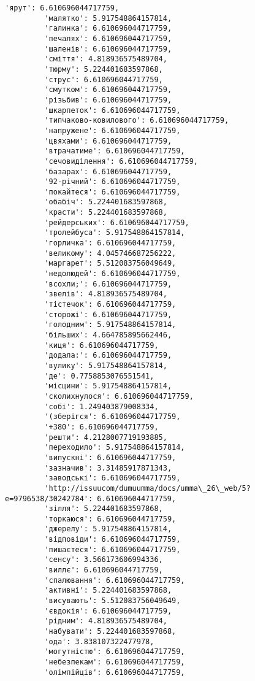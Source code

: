 \documentclass[11pt]{article}
\begin{document}
\begin{Verbatim}[commandchars=\\\{\}]
         'ярут': 6.610696044717759,
         'малятко': 5.917548864157814,
         'галинка': 6.610696044717759,
         'печалях': 6.610696044717759,
         'шаленів': 6.610696044717759,
         'сміття': 4.818936575489704,
         'тюрму': 5.224401683597868,
         'струс': 6.610696044717759,
         'смутком': 6.610696044717759,
         'різьбив': 6.610696044717759,
         'шкарпеток': 6.610696044717759,
         'типчаково-ковилового': 6.610696044717759,
         'напружене': 6.610696044717759,
         'цвяхами': 6.610696044717759,
         'втрачатиме': 6.610696044717759,
         'сечовиділення': 6.610696044717759,
         'базарах': 6.610696044717759,
         '92-річний': 6.610696044717759,
         'покайтеся': 6.610696044717759,
         'обабіч': 5.224401683597868,
         'красти': 5.224401683597868,
         'рейдерських': 6.610696044717759,
         'тролейбуса': 5.917548864157814,
         'горличка': 6.610696044717759,
         'великому': 4.045746687256222,
         'маргарет': 5.512083756049649,
         'недолюдей': 6.610696044717759,
         'всохли;': 6.610696044717759,
         'звелів': 4.818936575489704,
         'тістечок': 6.610696044717759,
         'сторожі': 6.610696044717759,
         'голодним': 5.917548864157814,
         'більших': 4.664785895662446,
         'киця': 6.610696044717759,
         'додала:': 6.610696044717759,
         'вулику': 5.917548864157814,
         'де': 0.7758853076551541,
         'місцини': 5.917548864157814,
         'сколихнулося': 6.610696044717759,
         'собі': 1.249403879008334,
         '(зберігся': 6.610696044717759,
         '+380': 6.610696044717759,
         'решти': 4.2128007719193885,
         'переходило': 5.917548864157814,
         'випускні': 6.610696044717759,
         'зазначив': 3.31485917871343,
         'заводські': 6.610696044717759,
         'http://issuucom/dumuumma/docs/umma\_26\_web/5?e=9796538/30242784': 6.610696044717759,
         'зілля': 5.224401683597868,
         'торкаюся': 6.610696044717759,
         'джерелу': 5.917548864157814,
         'відповіди': 6.610696044717759,
         'пишаєтеся': 6.610696044717759,
         'сенсу': 3.566173606994336,
         'виллє': 6.610696044717759,
         'спалювання': 6.610696044717759,
         'активні': 5.224401683597868,
         'висувають': 5.512083756049649,
         'євдокія': 6.610696044717759,
         'рідним': 4.818936575489704,
         'набувати': 5.224401683597868,
         'ода': 3.838107322477978,
         'могутністю': 6.610696044717759,
         'небезпекам': 6.610696044717759,
         'олімпійців': 6.610696044717759,

\end{Verbatim}
\end{document}
